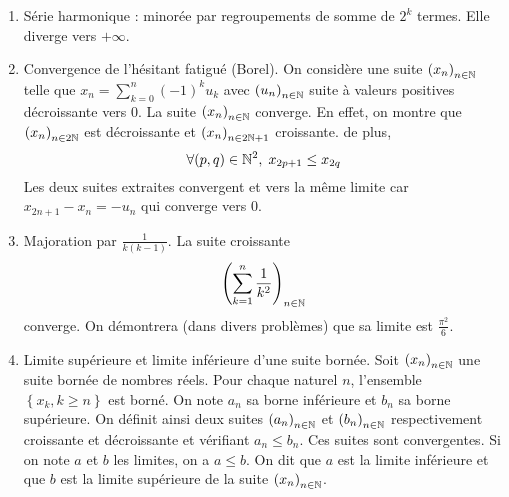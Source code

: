 \begin{exples}
 \begin{enumerate}
 \item Série harmonique : minorée par regroupements de somme de $2^k$ termes. Elle diverge vers $+\infty$.
 \item Convergence de l'hésitant fatigué (Borel). On considère une suite $\left( x_n\right)_{n\in \mathbb{N}}$ telle que $x_n = \sum_{k=0}^{n}(-1)^k u_k$ avec $\left( u_n\right)_{n\in \mathbb{N}}$ suite à valeurs positives décroissante vers $0$. La suite $\left( x_n\right)_{n\in \mathbb{N}}$ converge. En effet, on montre que $\left( x_n\right)_{n\in 2\mathbb{N}}$ est décroissante et $\left( x_n\right)_{n\in 2\mathbb{N}+1}$ croissante. de plus,
 \[
  \forall (p,q)\in \mathbb{N}^2, \; x_{2p + 1} \leq x_{2q}
 \]
Les deux suites extraites convergent et vers la même limite car $x_{2n+1} - x_n = - u_n$ qui converge vers $0$. 
 \item Majoration par $\frac{1}{k(k-1)}$. La suite croissante 
 \begin{displaymath}
   \left( \sum_{k=1}^n\frac{1}{k^2}\right)_{n\in \mathbb{N}}
 \end{displaymath}
converge. On démontrera (dans divers problèmes) que sa limite est $\frac{\pi^2}{6}$. 
 \item Limite supérieure et limite inférieure d'une suite bornée.\newline
 Soit $\left( x_n\right)_{n\in \mathbb{N}}$ une suite bornée de nombres réels. Pour chaque naturel $n$, l'ensemble $\left\lbrace x_k , k\geq n\right\rbrace$ est borné. On note $a_n$ sa borne inférieure et $b_n$ sa borne supérieure. On définit ainsi deux suites $\left( a_n\right)_{n\in \mathbb{N}}$ et $\left( b_n\right)_{n\in \mathbb{N}}$ respectivement croissante et décroissante et vérifiant $a_n \leq b_n$. Ces suites sont convergentes. Si on note $a$ et $b$ les limites, on a $a\leq b$. On dit que $a$ est la limite inférieure et que $b$ est la limite supérieure de la suite $\left( x_n\right)_{n\in \mathbb{N}}$.
\end{enumerate}
\end{exples}

